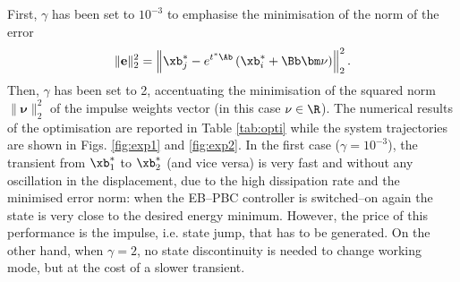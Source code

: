 First, $\gamma$ has been set to $10^{-3}$ to emphasise the minimisation of the norm of the error 
%
\begin{equation}
    \|\mathbf{e}\|_2^2=\left\|\xb_j^* - e^{t^*\Ab}\left(\xb_i^*+\Bb\bm\nu\right)\right\|^2_2.
\end{equation}
%
Then, $\gamma$ has been set to 2, accentuating the minimisation of the squared norm $\|\bm\nu\|_2^2$ of the impulse weights vector (in this case $\nu\in\R$). The numerical results of the optimisation are reported in Table \ref{tab:opti} while the system trajectories are shown in Figs. \ref{fig:exp1} and \ref{fig:exp2}. In the first case ($\gamma = 10^{-3}$), the transient from $\xb_1^*$ to $\xb_2^*$ (and vice versa) is very fast and without any oscillation in the displacement, due to the high dissipation rate and the minimised error norm: when the EB--PBC controller is switched--on again the state is very close to the desired energy minimum. However, the price of this performance is the impulse, i.e. state jump, that has to be generated. On the other hand, when $\gamma = 2$, no state discontinuity is needed to change working mode, but at the cost of a slower transient.
%
\begin{table}[h]
    \caption{Hybrid controller optimisation results.}
	\centering
	\label{tab:opti}
\end{table}	
%
%
%
